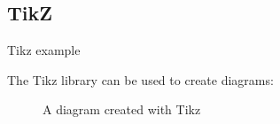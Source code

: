 \subsection{TikZ}

\begin{frame}{Tikz example}

  The Tikz library can be used to create diagrams:
  
  \vspace{0.4cm}

  \begin{figure}
    \centering
    
    \caption{A diagram created with Tikz}
  \end{figure}

\end{frame}